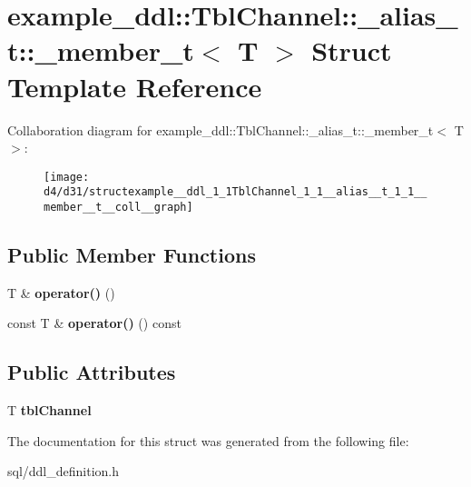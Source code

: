 \hypertarget{structexample__ddl_1_1TblChannel_1_1__alias__t_1_1__member__t}{}\section{example\+\_\+ddl\+:\+:Tbl\+Channel\+:\+:\+\_\+alias\+\_\+t\+:\+:\+\_\+member\+\_\+t$<$ T $>$ Struct Template Reference}
\label{structexample__ddl_1_1TblChannel_1_1__alias__t_1_1__member__t}


Collaboration diagram for example\+\_\+ddl\+:\+:Tbl\+Channel\+:\+:\+\_\+alias\+\_\+t\+:\+:\+\_\+member\+\_\+t$<$ T $>$\+:
\nopagebreak
\begin{figure}[H]
\begin{center}
\leavevmode
\texttt{[image: d4/d31/structexample\_\_ddl\_1\_1TblChannel\_1\_1\_\_alias\_\_t\_1\_1\_\_member\_\_t\_\_coll\_\_graph]}
\end{center}
\end{figure}
\subsection*{Public Member Functions}
\begin{DoxyCompactItemize}
\item 
\hypertarget{structexample__ddl_1_1TblChannel_1_1__alias__t_1_1__member__t_a22d319695e372b51d41304d0ddfcb42d}{}T \& {\bfseries operator()} ()\label{structexample__ddl_1_1TblChannel_1_1__alias__t_1_1__member__t_a22d319695e372b51d41304d0ddfcb42d}

\item 
\hypertarget{structexample__ddl_1_1TblChannel_1_1__alias__t_1_1__member__t_a5cfc1f61fb45db014b9e86f5dd319917}{}const T \& {\bfseries operator()} () const \label{structexample__ddl_1_1TblChannel_1_1__alias__t_1_1__member__t_a5cfc1f61fb45db014b9e86f5dd319917}

\end{DoxyCompactItemize}
\subsection*{Public Attributes}
\begin{DoxyCompactItemize}
\item 
\hypertarget{structexample__ddl_1_1TblChannel_1_1__alias__t_1_1__member__t_aae7fc3cca4a53175cf9068fc551db61d}{}T {\bfseries tbl\+Channel}\label{structexample__ddl_1_1TblChannel_1_1__alias__t_1_1__member__t_aae7fc3cca4a53175cf9068fc551db61d}

\end{DoxyCompactItemize}


The documentation for this struct was generated from the following file\+:\begin{DoxyCompactItemize}
\item 
sql/ddl\+\_\+definition.\+h\end{DoxyCompactItemize}
